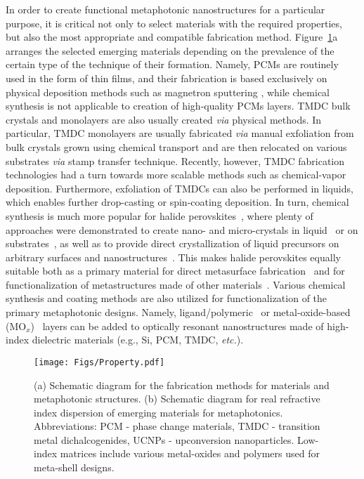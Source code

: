 \documentclass[journal=chreay,manuscript=review]{achemso}
\begin{document}
In order to create functional metaphotonic nanostructures for a particular purpose, it is critical not only to select materials with the required properties, but also the most appropriate and compatible fabrication method. Figure~\ref{fig:property}a arranges the selected emerging materials depending on the prevalence of the certain type of the technique of their formation. Namely, PCMs are routinely used in the form of thin films, and their fabrication is based exclusively on  physical deposition methods such as magnetron sputtering \cite{wang2016optically}, while chemical synthesis is not applicable to creation of high-quality PCMs layers. TMDC bulk crystals and monolayers are also usually created \textit{via} physical methods. In particular, TMDC monolayers are usually fabricated \textit{via} manual exfoliation from bulk crystals grown using chemical transport \cite{ubaldini2013chloride} and are then relocated on various substrates \textit{via} stamp transfer technique. Recently, however, TMDC fabrication technologies had a turn towards more scalable methods such as chemical-vapor deposition\cite{shree2019high}. Furthermore, exfoliation of TMDCs can also be performed in liquids\cite{coleman2011two}, which enables further drop-casting or spin-coating deposition. In turn, chemical synthesis is much more popular for halide perovskites~\cite{dunlap2018synthetic}, where plenty of approaches were demonstrated to create nano- and micro-crystals in liquid~\cite{dey2021state} or on substrates~\cite{im20116, pushkarev2018few}, as well as to provide direct crystallization of liquid precursors on arbitrary surfaces and nanostructures~\cite{liang1998synthesis,era1997self, barrows2014efficient}. This makes halide perovskites equally suitable both as a primary material for direct metasurface fabrication~\cite{berestennikov2019active} and for functionalization of metastructures made of other materials~\cite{berestennikov2021enhanced}. Various chemical synthesis and coating methods are also utilized for functionalization of the primary metaphotonic designs. Namely, ligand/polymeric~\cite{staude2015shaping,chen2016functionalization,zyuzin2018photoluminescence,wu2020room} or metal-oxide-based (MO$_x$)~\cite{choi2015zinc, karvounis2020barium} layers can be added to optically resonant nanostructures made of high-index dielectric materials (e.g., Si, PCM, TMDC, \textit{etc.}).



\begin{figure}[t!]
    \centering
    \texttt{[image: Figs/Property.pdf]}
    \caption{(a) Schematic diagram for the fabrication methods for materials and metaphotonic structures. (b) Schematic diagram for real refractive index dispersion of emerging materials for metaphotonics. Abbreviations: PCM - phase change materials, TMDC - transition metal dichalcogenides, UCNPs - upconversion nanoparticles. Low-index matrices include various metal-oxides and polymers used for meta-shell designs.}
    \label{fig:property}
\end{figure}
\end{document}
